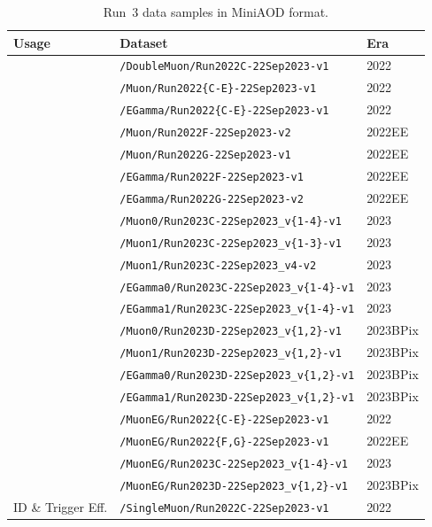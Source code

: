 \begin{table}[htbp]
  \centering
  \footnotesize
  \begin{tabular}{lll}
  \hline\hline
  \textbf{Usage} & \textbf{Dataset} & \textbf{Era} \\
  \hline
  & \texttt{/DoubleMuon/Run2022C-22Sep2023-v1} & 2022 \\
  & \texttt{/Muon/Run2022\{C-E\}-22Sep2023-v1} & 2022 \\
  & \texttt{/EGamma/Run2022\{C-E\}-22Sep2023-v1} & 2022 \\
  & \texttt{/Muon/Run2022F-22Sep2023-v2} & 2022EE \\
  & \texttt{/Muon/Run2022G-22Sep2023-v1} & 2022EE \\
  & \texttt{/EGamma/Run2022F-22Sep2023-v1} & 2022EE \\
  & \texttt{/EGamma/Run2022G-22Sep2023-v2} & 2022EE \\
  & \texttt{/Muon0/Run2023C-22Sep2023\_v\{1-4\}-v1} & 2023 \\
  & \texttt{/Muon1/Run2023C-22Sep2023\_v\{1-3\}-v1} & 2023 \\
  & \texttt{/Muon1/Run2023C-22Sep2023\_v4-v2} & 2023 \\
  & \texttt{/EGamma0/Run2023C-22Sep2023\_v\{1-4\}-v1} & 2023 \\
  & \texttt{/EGamma1/Run2023C-22Sep2023\_v\{1-4\}-v1} & 2023 \\
  & \texttt{/Muon0/Run2023D-22Sep2023\_v\{1,2\}-v1} & 2023BPix \\
  & \texttt{/Muon1/Run2023D-22Sep2023\_v\{1,2\}-v1} & 2023BPix \\
  & \texttt{/EGamma0/Run2023D-22Sep2023\_v\{1,2\}-v1} & 2023BPix \\
  & \texttt{/EGamma1/Run2023D-22Sep2023\_v\{1,2\}-v1} & 2023BPix \\
  \hline
  & \texttt{/MuonEG/Run2022\{C-E\}-22Sep2023-v1} & 2022 \\
  & \texttt{/MuonEG/Run2022\{F,G\}-22Sep2023-v1} & 2022EE \\
  & \texttt{/MuonEG/Run2023C-22Sep2023\_v\{1-4\}-v1} & 2023 \\
  & \texttt{/MuonEG/Run2023D-22Sep2023\_v\{1,2\}-v1} & 2023BPix \\
  \hline
  ID \& Trigger Eff. & \texttt{/SingleMuon/Run2022C-22Sep2023-v1} & 2022 \\
  \hline\hline
  \end{tabular}
  \caption{Run~3 data samples in MiniAOD format.}
  \label{tab:datasets_run3}
\end{table}

